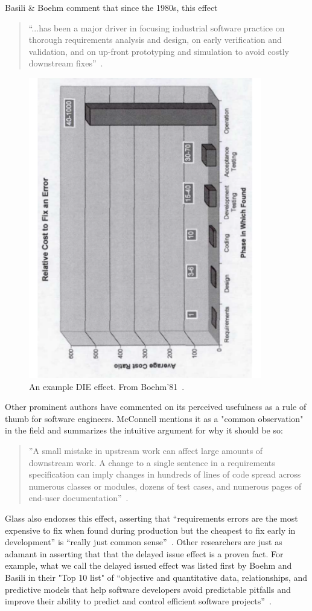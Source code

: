 \documentclass[smallcondesed]{svjour3}
\begin{document}
 Basili \& Boehm comment that since the 1980s,  this effect
 \begin{quote}
``...has been a major driver in focusing
industrial software practice on thorough
requirements analysis and design,
on early verification and validation, and
on up-front prototyping and simulation
to avoid costly downstream fixes''~\cite{boehm01}.
\end{quote}
 \begin{figure}[!t]  
\begin{center}
\includegraphics[angle=270,width=4in]{img/b81.pdf}
 \end{center}
 \caption{An example DIE effect. From Boehm'81~\cite{Boehm81}. }\label{fig:b81}
 \end{figure}
Other prominent authors have commented on its perceived usefulness as a rule of thumb for software engineers.  McConnell mentions it as a "common observation" in the field and  summarizes the intuitive argument for why it should be so: 
\begin{quote}
''A small mistake in upstream work can affect large amounts of downstream work. A change to a single sentence in a requirements specification can imply changes in hundreds of lines of code spread across numerous classes or modules, dozens of test cases, and numerous pages of end-user documentation''~\cite{mcconnell01}. 
\end{quote}
Glass also endorses this effect, asserting that ``requirements errors are the most expensive to fix when found during production but the cheapest to fix early in development'' is ``really just common sense''~\cite{glass02}.  Other researchers
are just as adamant in asserting that that the delayed issue effect is a proven
fact.
For example, what we call the delayed issued effect was listed first by Boehm and Basili in their "Top 10 list" of ``objective and quantitative data, relationships,
and predictive models that help
software developers avoid predictable pitfalls
and improve their ability to predict
and control efficient software projects''~\cite{boehm01}.
  
\end{document}
